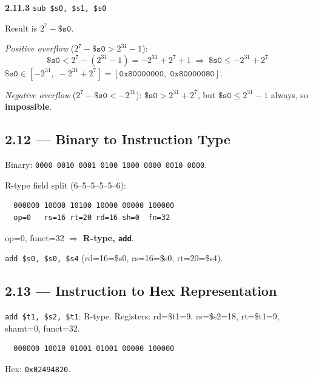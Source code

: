 \medskip\noindent\textbf{2.11.3} \texttt{sub \$s0, \$s1, \$s0}

Result is $2^{7} - \texttt{\$s0}$.

\smallskip
\noindent\textit{Positive overflow}
($2^{7} - \texttt{\$s0} > 2^{31}-1$):
\[
  \texttt{\$s0} < 2^{7}-(2^{31}-1) = -2^{31}+2^{7}+1
  \;\Longrightarrow\;
  \texttt{\$s0} \le -2^{31}+2^{7}
\]
$\texttt{\$s0} \in [-2^{31},\; -2^{31}+2^{7}]
= [\texttt{0x80000000},\; \texttt{0x80000080}]$.

\smallskip
\noindent\textit{Negative overflow}
($2^{7} - \texttt{\$s0} < -2^{31}$):
$\texttt{\$s0} > 2^{31}+2^{7}$,
but $\texttt{\$s0} \le 2^{31}-1$ always, so \textbf{impossible}.

\subsection*{2.12 --- Binary to Instruction Type}
\hypertarget{sol-2.12}{}

Binary: \texttt{0000 0010 0001 0100 1000 0000 0010 0000}.

R-type field split (6--5--5--5--5--6):
\begin{verbatim}
  000000 10000 10100 10000 00000 100000
  op=0   rs=16 rt=20 rd=16 sh=0  fn=32
\end{verbatim}
op=0, funct=32 $\Rightarrow$ \textbf{R-type, \texttt{add}}.

\texttt{add \$s0, \$s0, \$s4} \quad (rd=16=\$s0, rs=16=\$s0, rt=20=\$s4).

\subsection*{2.13 --- Instruction to Hex Representation}
\hypertarget{sol-2.13}{}

\texttt{add \$t1, \$s2, \$t1}: R-type.
Registers: rd=\$t1=9, rs=\$s2=18, rt=\$t1=9, shamt=0, funct=32.
\begin{verbatim}
  000000 10010 01001 01001 00000 100000
\end{verbatim}
Hex: \texttt{0x02494820}.

